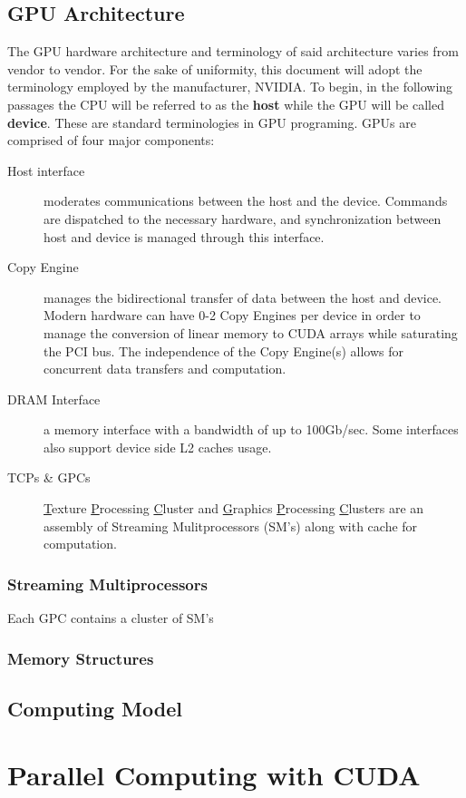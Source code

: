 \subsection{GPU Architecture}
The GPU hardware architecture and terminology of said architecture varies from
vendor to vendor.  For the sake of uniformity, this document will adopt the
terminology employed by the manufacturer, NVIDIA.  To begin, in the following passages the CPU
will be referred to as the \textbf{host} while the GPU will be called \textbf{device}.
These are standard terminologies in GPU programing. GPUs are comprised of four major components:
\begin{description}
  \item[Host interface] moderates communications between the host and the device.
  Commands are dispatched to the necessary hardware, and synchronization between
  host and device is managed through this interface.
  \item[Copy Engine] manages the bidirectional transfer of data between the host
  and device.  Modern hardware can have 0-2 Copy Engines per device in order to
  manage the conversion of linear memory to CUDA arrays while saturating the PCI
  bus.  The independence of the Copy Engine(s) allows for concurrent data transfers
  and computation.
  \item[DRAM Interface] a memory interface with a bandwidth of up to 100Gb/sec.
  Some interfaces also support device side L2 caches usage.
  \item[TCPs \& GPCs] \underline{T}exture \underline{P}rocessing \underline{C}luster
  and \underline{G}raphics \underline{P}rocessing \underline{C}lusters are an assembly
  of Streaming Mulitprocessors (SM's) along with cache for computation.
\end{description}\cite{Wilt}

\subsubsection{Streaming Multiprocessors}
Each GPC contains a cluster of SM's


\subsubsection{Memory Structures}

\subsection{Computing Model}

\section{Parallel Computing with CUDA}
